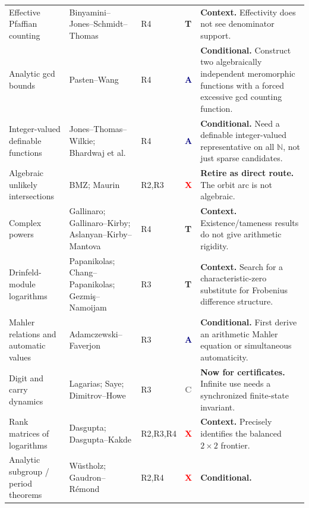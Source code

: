 \documentclass[10pt,letterpaper]{article}
\newcommand{\N}{\mathbb N}
\newcommand{\Rtwo}{\textsf{R2}}
\newcommand{\Rthree}{\textsf{R3}}
\newcommand{\Rfour}{\textsf{R4}}
\newcommand{\badgeAdapt}{\textcolor{navy}{\textbf{A}}}
\newcommand{\badgeTemplate}{\textcolor{amber}{\textbf{T}}}
\newcommand{\badgeDiagnostic}{\textcolor{red}{\textbf{X}}}
\newcommand{\badgeCompute}{\textcolor{graytext}{\textbf{C}}}
\begin{document}
\begin{longtable}{@{}L{0.225\textwidth}L{0.275\textwidth}C{0.08\textwidth}C{0.065\textwidth}L{0.30\textwidth}@{}}
Effective Pfaffian counting & Binyamini--Jones--Schmidt--Thomas
\cite{BinyaminiJonesSchmidtThomas} & \Rfour & \badgeTemplate & \textbf{Context.} Effectivity
does not see denominator support.\\
\addlinespace
Analytic gcd bounds & Pasten--Wang \cite{PastenWang} & \Rfour & \badgeAdapt &
\textbf{Conditional.} Construct two algebraically independent meromorphic functions with a
forced excessive gcd counting function.\\
\addlinespace
Integer-valued definable functions & Jones--Thomas--Wilkie; Bhardwaj et al.
\cite{JonesThomasWilkie,BhardwajEtAl} & \Rfour & \badgeAdapt & \textbf{Conditional.} Need a
definable integer-valued representative on all \(\N\), not just sparse candidates.\\
\addlinespace
Algebraic unlikely intersections & BMZ; Maurin \cite{BMZ1999,Maurin2008} &
\Rtwo,\Rthree & \badgeDiagnostic & \textbf{Retire as direct route.} The orbit arc is not
algebraic.\\
\addlinespace
Complex powers & Gallinaro; Gallinaro--Kirby; Aslanyan--Kirby--Mantova
\cite{Gallinaro2025,GallinaroKirby,AslanyanKirbyMantova} & \Rfour & \badgeTemplate &
\textbf{Context.} Existence/tameness results do not give arithmetic rigidity.\\
\addlinespace
Drinfeld-module logarithms & Papanikolas; Chang--Papanikolas; Gezmi\c{s}--Namoijam
\cite{Papanikolas2008,ChangPapanikolas,GezmisNamoijam} & \Rthree & \badgeTemplate &
\textbf{Context.} Search for a characteristic-zero substitute for Frobenius difference
structure.\\
\addlinespace
Mahler relations and automatic values & Adamczewski--Faverjon
\cite{AdamczewskiFaverjon2017,AdamczewskiFaverjon2018,AdamczewskiMahlerProblem} & \Rthree &
\badgeAdapt & \textbf{Conditional.} First derive an arithmetic Mahler equation or simultaneous
automaticity.\\
\addlinespace
Digit and carry dynamics & Lagarias; Saye; Dimitrov--Howe
\cite{Lagarias2009,Saye2022,DimitrovHowe} & \Rthree & \badgeCompute & \textbf{Now for
certificates.} Infinite use needs a synchronized finite-state invariant.\\
\addlinespace
Rank matrices of logarithms & Dasgupta; Dasgupta--Kakde
\cite{DasguptaPartI,DasguptaKakdePartII} & \Rtwo,\Rthree,\Rfour & \badgeDiagnostic &
\textbf{Context.} Precisely identifies the balanced \(2\times2\) frontier.\\
\addlinespace
Analytic subgroup / period theorems & W\"ustholz; Gaudron--R\'emond
\cite{Wustholz1989,GaudronRemond} & \Rtwo,\Rfour & \badgeDiagnostic & \textbf{Conditional.}

\end{longtable}
\end{document}
